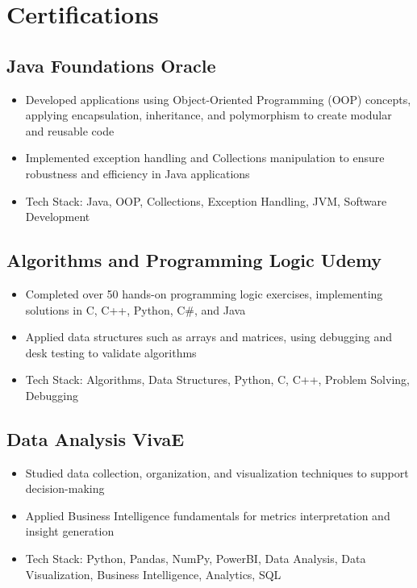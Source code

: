 \documentclass[a4paper,10pt]{article}
\begin{document}

\section{Certifications}

    \subsection*{\texorpdfstring{
            \textbf{Java Foundations} \hfill Oracle
        }{
            Java Foundations -- Oracle
        }}
        \begin{itemize}
            \item Developed applications using Object-Oriented Programming (OOP) concepts, applying encapsulation, inheritance, and polymorphism to create modular and reusable code
            \item Implemented exception handling and Collections manipulation to ensure robustness and efficiency in Java applications
            \item Tech Stack: Java, OOP, Collections, Exception Handling, JVM, Software Development
        \end{itemize}

    \subsection*{\texorpdfstring{
            \textbf{Algorithms and Programming Logic} \hfill Udemy
        }{
            Algorithms and Programming Logic -- Udemy
        }}
        \begin{itemize}
            \item Completed over 50 hands-on programming logic exercises, implementing solutions in C, C++, Python, C\#, and Java
            \item Applied data structures such as arrays and matrices, using debugging and desk testing to validate algorithms
            \item Tech Stack: Algorithms, Data Structures, Python, C, C++, Problem Solving, Debugging
        \end{itemize}

    \subsection*{\texorpdfstring{
            \textbf{Data Analysis} \hfill VivaE
        }{
            Data Analysis -- VivaE
        }}
        \begin{itemize}
            \item Studied data collection, organization, and visualization techniques to support decision-making
            \item Applied Business Intelligence fundamentals for metrics interpretation and insight generation
            \item Tech Stack: Python, Pandas, NumPy, PowerBI, Data Analysis, Data Visualization, Business Intelligence, Analytics, SQL
        \end{itemize}
\end{document}
